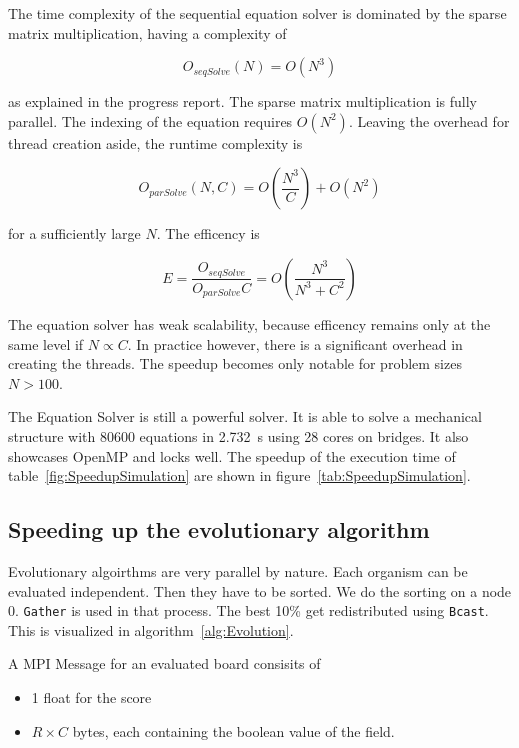\documentclass[12pt]{article}
\begin{document}
The time complexity of the sequential equation solver is dominated by the sparse matrix multiplication, having a complexity of 

\begin{equation}
    O_\mathit{seqSolve}(N) = O(N^3) 
\end{equation}

as explained in the progress report. The sparse matrix multiplication is fully parallel. The indexing of the equation requires $O(N^2)$. Leaving the overhead for thread creation aside, the runtime complexity is 

\begin{equation}
    O_\mathit{parSolve}(N, C) = O \left(\frac{N^3}{C}\right) + O(N^2)
\end{equation}

for a sufficiently large $N$. The efficency is

\begin{equation}
    E = \frac{O_\mathit{seqSolve}}{O_\mathit{parSolve} C} = O\left(\frac{N^3}{N^3 + C^2}\right)
\end{equation}

The equation solver has weak scalability, because efficency remains only at the same level if $N \propto C$. In practice however, there is a significant overhead in creating the threads. The speedup becomes only notable for problem sizes $N > 100$.

The Equation Solver is still a powerful solver. It is able to solve a mechanical structure with 80600 equations in \SI{2.732}{\second} using 28 cores on bridges. It also showcases OpenMP and locks well. The speedup of the execution time of table~\ref{fig:SpeedupSimulation} are shown in figure~\ref{tab:SpeedupSimulation}.

\subsection{Speeding up the evolutionary algorithm}

Evolutionary algoirthms are very parallel by nature. Each organism can be evaluated independent. Then they have to be sorted. We do the sorting on a node 0. \texttt{Gather} is used in that process. The best 10\% get redistributed using \texttt{Bcast}. This is visualized in algorithm~\ref{alg:Evolution}.

A MPI Message for an evaluated board consisits of

\begin{itemize}
    \item 1 float for the score
    \item $R \times C$ bytes, each containing the boolean value of the field.
\end{itemize}
\end{document}
